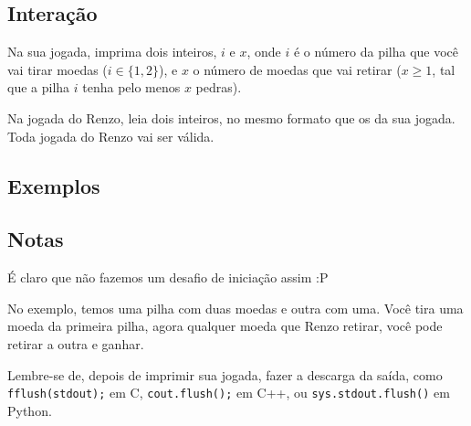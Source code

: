 \subsection*{Interação}

Na sua jogada, imprima dois inteiros, $i$ e $x$, onde $i$ é o número da pilha que você vai tirar moedas ($i \in \{1, 2\}$), e $x$ o número de moedas que vai retirar ($x \geq 1$, tal que a pilha $i$ tenha pelo menos $x$ pedras).

Na jogada do Renzo, leia dois inteiros, no mesmo formato que os da sua jogada. Toda jogada do Renzo vai ser válida.



\subsection*{Exemplos}


\subsection*{Notas}

É claro que não fazemos um desafio de iniciação assim :P

No exemplo, temos uma pilha com duas moedas e outra com uma. Você tira uma moeda da primeira pilha, agora qualquer moeda que Renzo retirar, você pode retirar a outra e ganhar.

Lembre-se de, depois de imprimir sua jogada, fazer a descarga da saída, como \texttt{fflush(stdout);} em C, \texttt{cout.flush();} em C++, ou \texttt{sys.stdout.flush()} em Python.

